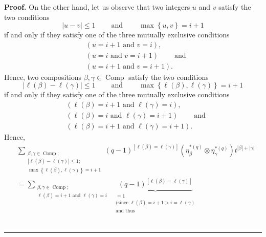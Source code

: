 \documentclass[numbers=enddot,12pt,final,onecolumn,notitlepage]{scrartcl}%
\theoremstyle{definition}
\newenvironment{proof}[1][Proof]{\noindent\textbf{#1.} }{\ \rule{0.5em}{0.5em}}
\let\sumnonlimits\sum
\renewcommand{\sum}{\sumnonlimits\limits}
\begin{document}
\begin{proof}
On the other hand, let us observe that two integers $u$ and $v$ satisfy the
two conditions%
\[
\left\vert u-v\right\vert \leq1\ \ \ \ \ \ \ \ \ \ \text{and}%
\ \ \ \ \ \ \ \ \ \ \max\left\{  u,v\right\}  =i+1
\]
if and only if they satisfy one of the three mutually exclusive conditions%
\begin{align*}
&  \left(  u=i+1\text{ and }v=i\right)  ,\\
&  \left(  u=i\text{ and }v=i+1\right)  \ \ \ \ \ \ \ \ \ \ \text{and}\\
&  \left(  u=i+1\text{ and }v=i+1\right)  .
\end{align*}
Hence, two compositions $\beta,\gamma\in\operatorname*{Comp}$ satisfy the two
conditions%
\[
\left\vert \ell\left(  \beta\right)  -\ell\left(  \gamma\right)  \right\vert
\leq1\ \ \ \ \ \ \ \ \ \ \text{and}\ \ \ \ \ \ \ \ \ \ \max\left\{
\ell\left(  \beta\right)  ,\ell\left(  \gamma\right)  \right\}  =i+1
\]
if and only if they satisfy one of the three mutually exclusive conditions%
\begin{align*}
&  \left(  \ell\left(  \beta\right)  =i+1\text{ and }\ell\left(
\gamma\right)  =i\right)  ,\\
&  \left(  \ell\left(  \beta\right)  =i\text{ and }\ell\left(  \gamma\right)
=i+1\right)  \ \ \ \ \ \ \ \ \ \ \text{and}\\
&  \left(  \ell\left(  \beta\right)  =i+1\text{ and }\ell\left(
\gamma\right)  =i+1\right)  .
\end{align*}
Hence,%
\begin{align*}
&  \sum_{\substack{\beta,\gamma\in\operatorname*{Comp};\\\left\vert
\ell\left(  \beta\right)  -\ell\left(  \gamma\right)  \right\vert \leq
1;\\\max\left\{  \ell\left(  \beta\right)  ,\ell\left(  \gamma\right)
\right\}  =i+1}}\left(  q-1\right)  ^{\left[  \ell\left(  \beta\right)
=\ell\left(  \gamma\right)  \right]  }\left(  \eta_{\beta}^{\ast\left(
q\right)  }\otimes\eta_{\gamma}^{\ast\left(  q\right)  }\right)  t^{\left\vert
\beta\right\vert +\left\vert \gamma\right\vert }\\
&  =\sum_{\substack{\beta,\gamma\in\operatorname*{Comp};\\\ell\left(
\beta\right)  =i+1\text{ and }\ell\left(  \gamma\right)  =i}%
}\ \ \underbrace{\left(  q-1\right)  ^{\left[  \ell\left(  \beta\right)
=\ell\left(  \gamma\right)  \right]  }}_{\substack{=1\\\text{(since }%
\ell\left(  \beta\right)  =i+1>i=\ell\left(  \gamma\right)  \\\text{and thus
}}}
\end{align*}
\end{proof}
\end{document}
